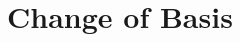 \documentclass[aspectratio=169]{beamer}
\newcommand{\diff}[1]{\frac{d}{d #1}}
\begin{document}



\section{Change of Basis}
\end{document}

